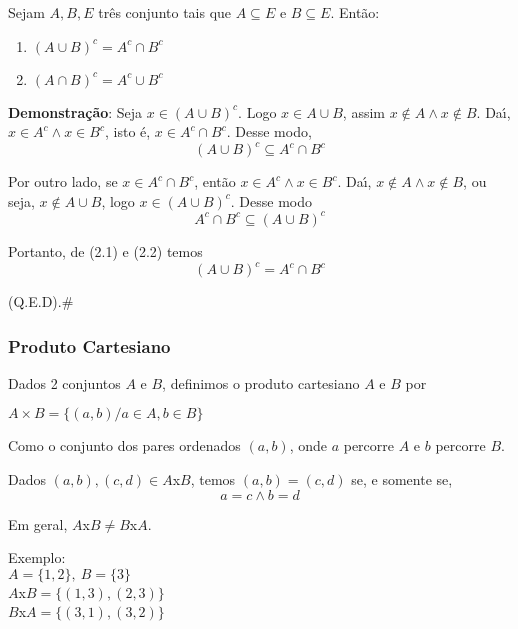\begin{proposicao} Sejam $A,B,E$ tr{\^e}s conjunto tais que $A\subseteq E$ e $B\subseteq E$. Ent{\~a}o:
\begin{enumerate}
\item $(A\cup B)^{c}=A^{c}\cap B^{c}$
\item $(A\cap B)^{c}=A^{c}\cup B^{c}$
\end{enumerate}
\end{proposicao}

\textbf{Demonstra{\c c}{\~a}o}: Seja $x\in(A\cup B)^{c}$. Logo $x\in A\cup B$, assim $x\notin A\wedge x\notin B$. Da{\'\i}, $x\in A^{c}\wedge x\in B^{c}$, isto {\'e}, $x\in A^{c}\cap B^{c}$. Desse modo,
\begin{equation}
(A\cup B)^{c}\subseteq A^{c}\cap B^{c}
\end{equation}

Por outro lado, se $x\in A^{c}\cap B^{c}$, ent{\~a}o $x\in A^{c}\wedge x\in B^{c}$. Da{\'\i}, $x\notin A\wedge x\notin B$, ou seja, $x\notin A\cup B$, logo $x\in (A\cup B)^{c}$. Desse modo
\begin{equation}
A^{c}\cap B^{c}\subseteq(A\cup B)^{c}
\end{equation}

Portanto, de (2.1) e (2.2) temos \[(A\cup B)^{c}=A^{c}\cap B^{c}\]

(Q.E.D).\#\\

\subsubsection{Produto Cartesiano}

\begin{definicao} Dados 2 conjuntos $A$ e $B$, definimos o produto cartesiano $A$ e $B$ por
\begin{center}
$A\times B=\{(a,b)/a\in A,b\in B\}$
\end{center}
\end{definicao}

Como o conjunto dos pares ordenados $(a,b)$, onde $a$ percorre $A$ e $b$ percorre $B$.

Dados $(a,b),(c,d)\in A$x$B$, temos $(a,b)=(c,d)$ se, e somente se, \[a=c\wedge b=d\]

Em geral, $A$x$B\neq B$x$A$.

Exemplo:\\
$A=\{1,2\},\ B=\{3\}$\\
$A$x$B=\{(1,3),(2,3)\}$\\
$B$x$A=\{(3,1),(3,2)\}$

